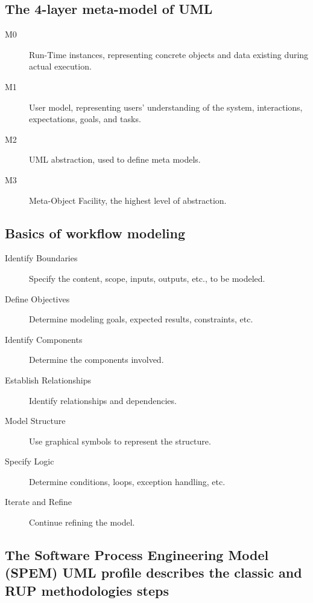 \documentclass[11pt,journal,compsoc]{IEEEtran}
\begin{document}
\subsection{The 4-layer meta-model of UML}

\begin{description}
    \item[M0] Run-Time instances, representing concrete objects and data existing during actual execution.

    \item[M1] User model, representing users' understanding of the system, interactions, expectations, goals, and tasks.

    \item[M2] UML abstraction, used to define meta models.

    \item[M3] Meta-Object Facility, the highest level of abstraction.
\end{description}


\subsection{Basics of workflow modeling}

\begin{description}
    \item[Identify Boundaries] Specify the content, scope, inputs, outputs, etc., to be modeled.

    \item[Define Objectives] Determine modeling goals, expected results, constraints, etc.

    \item[Identify Components] Determine the components involved.

    \item[Establish Relationships] Identify relationships and dependencies.

    \item[Model Structure] Use graphical symbols to represent the structure.

    \item[Specify Logic] Determine conditions, loops, exception handling, etc.

    \item[Iterate and Refine] Continue refining the model.
\end{description}


\subsection{The Software Process Engineering Model (SPEM) UML profile describes the classic and RUP methodologies steps}
\end{document}
